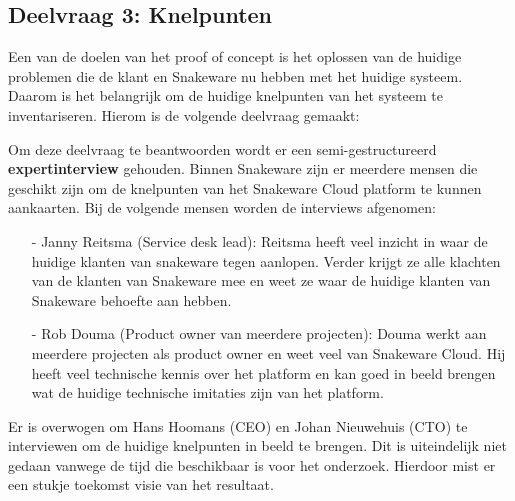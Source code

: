 \subsection{Deelvraag 3: Knelpunten}
Een van de doelen van het proof of concept is het oplossen van de huidige problemen die de klant en Snakeware nu hebben met het huidige systeem.
Daarom is het belangrijk om de huidige knelpunten van het systeem te inventariseren.
Hierom is de volgende deelvraag gemaakt:

\begin{center}
    \textit{\SubquestionThree}
\end{center}

\whitespace[0.2]
Om deze deelvraag te beantwoorden wordt er een semi-gestructureerd \textbf{expertinterview} gehouden.
Binnen Snakeware zijn er meerdere mensen die geschikt zijn om de knelpunten van het Snakeware Cloud platform te kunnen aankaarten.
Bij de volgende mensen worden de interviews afgenomen:
\begin{itemize}
    \item[-] Janny Reitsma (Service desk lead): Reitsma heeft veel inzicht in waar de huidige klanten van snakeware tegen aanlopen.
        Verder krijgt ze alle klachten van de klanten van Snakeware mee en weet ze waar de huidige klanten van Snakeware behoefte aan hebben.
    \item[-] Rob Douma (Product owner van meerdere projecten): Douma werkt aan meerdere projecten als product owner en weet veel van Snakeware Cloud.
        Hij heeft veel technische kennis over het platform en kan goed in beeld brengen wat de huidige technische imitaties zijn van het platform.
\end{itemize}

\whitespace
Er is overwogen om Hans Hoomans (CEO) en Johan Nieuwehuis (CTO) te interviewen om de huidige knelpunten in beeld te brengen.
Dit is uiteindelijk niet gedaan vanwege de tijd die beschikbaar is voor het onderzoek.
Hierdoor mist er een stukje toekomst visie van het resultaat.
